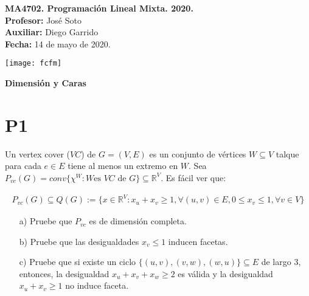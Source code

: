 \documentclass[10pt]{article}
\theoremstyle{plain}
\theoremstyle{definition}
\newcommand{\sca}{Diego Garrido}
\newcommand{\fecha}{14 de mayo  de 2020}
\begin{document}
\vspace*{-1.2 cm}
\begin{minipage}{0.6\textwidth}
\begin{flushleft}
\hspace*{-0.5cm}\textbf{MA4702. Programación Lineal Mixta. 2020.}\\
\hspace*{-0.5cm}\textbf{Profesor:} José Soto\\
\hspace*{-0.5cm}\textbf{Auxiliar:} \sca\\
\hspace*{-0.5cm}\textbf{Fecha:} \fecha.
\end{flushleft}
\end{minipage}
\begin{minipage}{0.36\textwidth}
\begin{flushright}
\texttt{[image: fcfm]}
\end{flushright}
\end{minipage}
\bigskip

\begin{center}
\LARGE\textbf{Dimensión y Caras}
\end{center}


\section{P1}
Un vertex cover ($VC$) de $G=(V,E)$ es un conjunto de vértices $W\subseteq V$ talque para cada $e \in E$ tiene al menos un extremo en $W$. Sea $P_{vc}(G)=conv\{\chi^{W}:W \text{es } VC \text{ de } G\} \subseteq\mathbb{R}^{V}$. Es fácil ver que:

\begin{align*}
  P_{vc}(G)\subseteq Q(G):=\{x\in\mathbb{R}^{V}:x_{u}+x_{v}\geq 1, \forall (u,v) \in E, 0\leq x_{v} \leq 1, \forall v \in V\}
\end{align*}

\begin{itemize}
\item[a)] Pruebe que $P_{vc}$ es de dimensión completa.

\item[b)] Pruebe que las desigualdades $x_{v}\leq1$ inducen facetas.

\item[c)] Pruebe que si existe un ciclo $\{(u,v), (v,w), (w,u)\}\subseteq E$ de largo 3, entonces, la desigualdad $x_{u}+x_{v}+x_{w}\geq2$ es válida y la desigualdad $x_{u}+x_{v}\geq1$ no induce faceta.

\end{itemize}
\end{document}
